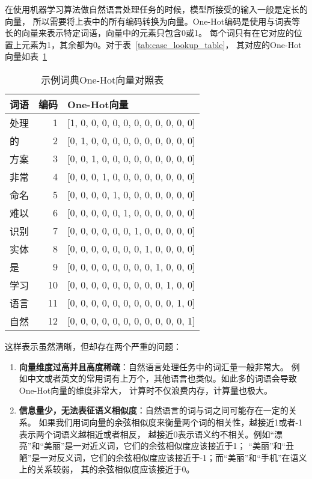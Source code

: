 在使用机器学习算法做自然语言处理任务的时候，模型所接受的输入一般是定长的向量，
所以需要将上表中的所有编码转换为向量。One-Hot编码是使用与词表等长的向量来表示特定词语，向量中的元素只包含0或1。
每个词只有在它对应的位置上元素为1，其余都为0。对于表~\ref{tab:case_lookup_table}，
其对应的One-Hot向量如表~\ref{tab:case_one_hot_lookup_table}

\begin{table}[!hpt]
    \caption[示例词典One-Hot向量对照表]{示例词典One-Hot向量对照表}
    \label{tab:case_one_hot_lookup_table}
    \centering
    \begin{tabular}{lrl} \toprule
      词语  &   编码 &  One-Hot向量 \\ \midrule
      处理	&	1	&   [1, 0, 0, 0, 0, 0, 0, 0, 0, 0, 0, 0]	\\
      的	&	2	&	[0, 1, 0, 0, 0, 0, 0, 0, 0, 0, 0, 0]	\\
      方案	&	3	&	[0, 0, 1, 0, 0, 0, 0, 0, 0, 0, 0, 0]	\\
      非常	&	4	&	[0, 0, 0, 1, 0, 0, 0, 0, 0, 0, 0, 0]	\\
      命名	&	5	&	[0, 0, 0, 0, 1, 0, 0, 0, 0, 0, 0, 0]	\\
      难以	&	6	&	[0, 0, 0, 0, 0, 1, 0, 0, 0, 0, 0, 0]	\\
      识别	&	7	&	[0, 0, 0, 0, 0, 0, 1, 0, 0, 0, 0, 0]	\\
      实体	&	8	&	[0, 0, 0, 0, 0, 0, 0, 1, 0, 0, 0, 0]	\\
      是	&	9	&	[0, 0, 0, 0, 0, 0, 0, 0, 1, 0, 0, 0]	\\
      学习	&	10	&	[0, 0, 0, 0, 0, 0, 0, 0, 0, 1, 0, 0]	\\
      语言	&	11	&	[0, 0, 0, 0, 0, 0, 0, 0, 0, 0, 1, 0]	\\
      自然	&	12	&	[0, 0, 0, 0, 0, 0, 0, 0, 0, 0, 0, 1]	\\ \bottomrule
    \end{tabular}
\end{table}

这样表示虽然清晰，但却存在两个严重的问题：
\begin{enumerate}
    \item \textbf{向量维度过高并且高度稀疏}：自然语言处理任务中的词汇量一般非常大。
    例如中文或者英文的常用词有上万个，其他语言也类似。如此多的词语会导致One-Hot向量的维度非常大，
    计算时不仅浪费内存，计算量也极大。
    \item \textbf{信息量少，无法表征语义相似度}：自然语言的词与词之间可能存在一定的关系。
    如果我们用词向量的余弦相似度来衡量两个词的相关性，越接近1或者-1表示两个词语义越相近或者相反，
    越接近0表示语义约不相关。例如“漂亮”和“美丽”是一对近义词，它们的余弦相似度应该接近于1；
    “美丽”和“丑陋”是一对反义词，它们的余弦相似度应该接近于-1；而“美丽”和“手机”在语义上的关系较弱，
    其的余弦相似度应该接近于0。
\end{enumerate}


